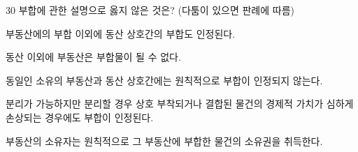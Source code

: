 \begin{question}{30}
부합에 관한 설명으로 옳지 않은 것은? (다툼이 있으면 판례에 따름)
\begin{choices}
  \item 부동산에의 부합 이외에 동산 상호간의 부합도 인정된다.
  \item 동산 이외에 부동산은 부합물이 될 수 없다.
  \item 동일인 소유의 부동산과 동산 상호간에는 원칙적으로 부합이 인정되지 않는다.
  \item 분리가 가능하지만 분리할 경우 상호 부착되거나 결합된 물건의 경제적 가치가 심하게 손상되는 경우에도 부합이 인정된다.
  \item 부동산의 소유자는 원칙적으로 그 부동산에 부합한 물건의 소유권을 취득한다.
\end{choices}
\end{question}
